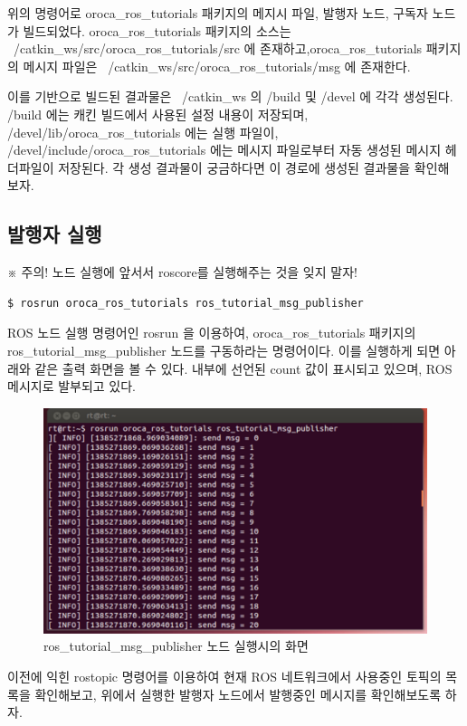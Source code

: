 위의 명령어로 oroca\_ros\_tutorials 패키지의 메지시 파일, 발행자 노드, 구독자 노드가 빌드되었다. 
oroca\_ros\_tutorials 패키지의 소스는 ~/catkin\_ws/src/oroca\_ros\_tutorials/src 에 존재하고,oroca\_ros\_tutorials 패키지의 메시지 파일은 ~/catkin\_ws/src/oroca\_ros\_tutorials/msg 에 존재한다.

이를 기반으로 빌드된 결과물은 ~/catkin\_ws 의 /build 및 /devel 에 각각 생성된다.
/build 에는 캐킨 빌드에서 사용된 설정 내용이 저장되며, /devel/lib/oroca\_ros\_tutorials 에는 실행 파일이, /devel/include/oroca\_ros\_tutorials 에는 메시지 파일로부터 자동 생성된 메시지 헤더파일이 저장된다. 각 생성 결과물이 궁금하다면 이 경로에 생성된 결과물을 확인해 보자.

\subsection{발행자 실행}

※ 주의! 노드 실행에 앞서서 roscore를 실행해주는 것을 잊지 말자!

\begin{lstlisting}[language=ROS]
$ rosrun oroca_ros_tutorials ros_tutorial_msg_publisher
\end{lstlisting}

ROS 노드 실행 명령어인 rosrun 을 이용하여, oroca\_ros\_tutorials 패키지의 ros\_tutorial\_msg\_publisher 노드를 구동하라는 명령어이다. 이를 실행하게 되면 아래와 같은 출력 화면을 볼 수 있다. 내부에 선언된 count 값이 표시되고 있으며, ROS 메시지로 발부되고 있다. 

\begin{figure}[h]
\centering\includegraphics[width=0.5\columnwidth]{pictures/chapter7/rosrun_ros_tutorial_msg_publisher.png}
\caption{ros\_tutorial\_msg\_publisher 노드 실행시의 화면}
\end{figure}

이전에 익힌 rostopic 명령어를 이용하여 현재 ROS 네트워크에서 사용중인 토픽의 목록을 확인해보고, 위에서 실행한 발행자 노드에서 발행중인 메시지를 확인해보도록 하자.

